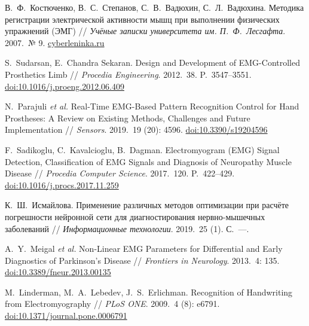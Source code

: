 \documentclass[a4paper,12pt]{article}
\begin{document}
\begin{thebibliography}{99}

В.~Ф.~Костюченко, В.~С.~Степанов, С.~В.~Вадюхин, С.~Л.~Вадюхина.
Методика регистрации электрической активности мышц при выполнении физических упражнений (ЭМГ) //
\textit{Учёные записки университета им. П.~Ф.~Лесгафта}. 2007.~№ 9.  
\href{https://cyberleninka.ru/article/n/metodika-registratsii-elektricheskoy-aktivnosti-myshts-pri-vypolnenii-fizicheskih-uprazhneniy-emg}{cyberleninka.ru}

S.~Sudarsan, E.~Chandra Sekaran.  
Design and Development of EMG-Controlled Prosthetics Limb //
\textit{Procedia Engineering}. 2012.~38. P.~3547–3551.  
\href{https://doi.org/10.1016/j.proeng.2012.06.409}{doi:10.1016/j.proeng.2012.06.409}

N.~Parajuli \textit{et al.}  
Real-Time EMG-Based Pattern Recognition Control for Hand Prostheses: A Review on Existing Methods, Challenges and Future Implementation //
\textit{Sensors}. 2019.~19 (20): 4596.  
\href{https://doi.org/10.3390/s19204596}{doi:10.3390/s19204596}

F.~Sadikoglu, C.~Kavalcioglu, B.~Dagman.  
Electromyogram (EMG) Signal Detection, Classification of EMG Signals and Diagnosis of Neuropathy Muscle Disease //
\textit{Procedia Computer Science}. 2017.~120. P.~422–429.  
\href{https://doi.org/10.1016/j.procs.2017.11.259}{doi:10.1016/j.procs.2017.11.259}

К.~Ш.~Исмайлова.  
Применение различных методов оптимизации при расчёте погрешности нейронной сети для диагностирования нервно-мышечных заболеваний //
\textit{Информационные технологии}. 2019.~25 (1). С.~—.

A.~Y.~Meigal \textit{et al.}  
Non-Linear EMG Parameters for Differential and Early Diagnostics of Parkinson’s Disease //
\textit{Frontiers in Neurology}. 2013.~4: 135.  
\href{https://doi.org/10.3389/fneur.2013.00135}{doi:10.3389/fneur.2013.00135}

M.~Linderman, M.~A.~Lebedev, J.~S.~Erlichman.  
Recognition of Handwriting from Electromyography //
\textit{PLoS ONE}. 2009.~4 (8): e6791.  
\href{https://doi.org/10.1371/journal.pone.0006791}{doi:10.1371/journal.pone.0006791}

\end{thebibliography}
\end{document}
